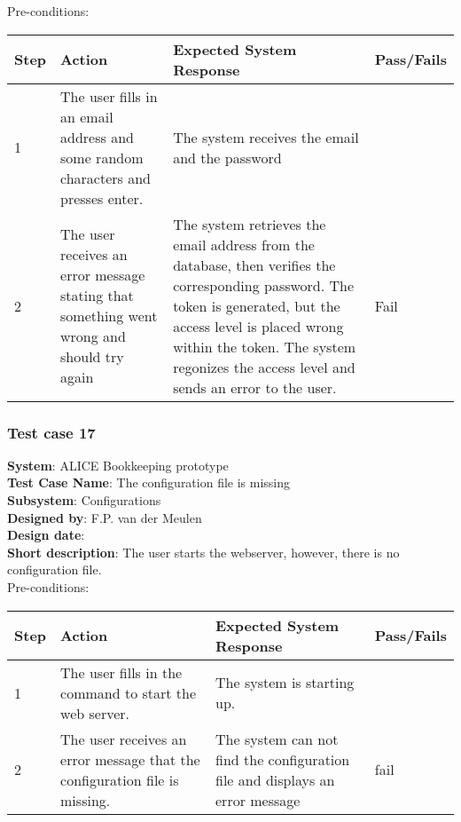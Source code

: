 Pre-conditions: \\

\begin{longtable}{ | p{0.8cm} | p{4.5cm} | p{6cm} | p{1.5cm} |}
\hline
Step & Action & Expected System Response & Pass/Fails  \\ \hline
1 & The user fills in an email address and some random characters and presses enter. & The system receives the email and the password &  \\ \hline
2 & The user receives an error message stating that something went wrong and should try again & The system retrieves the email address from the database, then verifies the corresponding password.  The token is generated, but the access level is placed wrong within the token. The system regonizes the access level and sends an error to the user. & Fail \\ \hline
\end{longtable}

\subsubsection{Test case 17}
\textbf{System}:  ALICE Bookkeeping prototype \\
\textbf{Test Case Name}:  The configuration file is missing \\
\textbf{Subsystem}:  Configurations \\
\textbf{Designed by}:  F.P. van der Meulen\\
\textbf{Design date}:  \\
\textbf{Short description}: The user starts the webserver, however, there is no configuration file. \\

Pre-conditions: \\

\begin{longtable}{ | p{0.8cm} | p{4.5cm} | p{6cm} | p{1.5cm} |}
\hline
Step & Action & Expected System Response & Pass/Fails  \\ \hline
1 & The user fills in the command to start the web server. & The system is starting up. &  \\ \hline
2 & The user receives an error message that the configuration file is missing. & The system can not find the configuration file and displays an error message & fail\\ \hline
 
\end{longtable}

